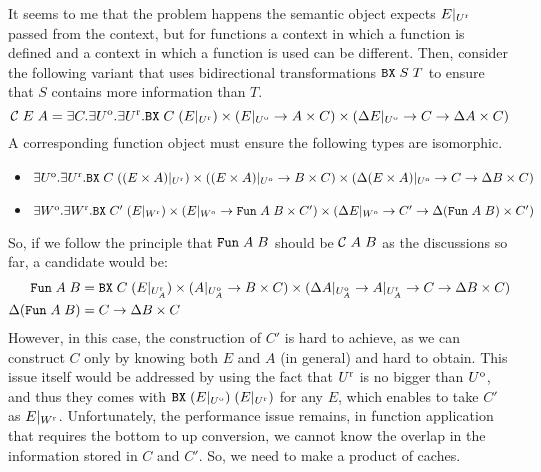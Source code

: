 \documentclass{article}
\theoremstyle{definition}
\begin{document}
It seems to me that the problem happens the semantic object expects $E|_{U^\mathrm{r}}$ passed from the context, but for functions a context in which a function is defined
and a context in which a function is used can be different. 
Then, consider the following variant that uses bidirectional transformations $\texttt{BX} \; S \; T$ to ensure that $S$ contains more information than $T$. 
\[
\mathcal{C} \; E \; A = \exists C. \exists U^\mathrm{o}. \exists U^\mathrm{r}. 
  \texttt{BX} \; C \; (E|_{U^\mathrm{r}}) \times 
  (E|_{U^\mathrm{o}} \to {A} \times C) \times 
  (\Delta E|_{U^\mathrm{o}} \to C \to \Delta A \times C)
\]
A corresponding function object must ensure the following types are isomorphic. 
\begin{itemize}
 \item \(
   \exists U^\mathrm{o}. \exists U^\mathrm{r}. 
   \texttt{BX} \; C \; ((E \times A)|_{U^\mathrm{r}}) \times 
   ((E \times A)|_{U^\mathrm{o}} \to {B} \times C) \times 
   (\Delta (E \times A)|_{U^\mathrm{o}} \to C \to \Delta B \times C)
   \) 
 \item \(
   \exists W^\mathrm{o}. \exists W^\mathrm{r}. 
   \texttt{BX} \; C' \; (E|_{W^\mathrm{r}}) \times 
   (E|_{W^\mathrm{o}} \to \texttt{Fun} \; A \; B \times C') \times 
   (\Delta E|_{W^\mathrm{o}}  \to C' \to \Delta (\texttt{Fun} \; A \; B) \times C')
   \)
\end{itemize} 
So, if we follow the principle that $\texttt{Fun} \; A \; B$ should be $\mathcal{C} \; A \; B$ as the discussions so far, a candidate would be: 
\begin{align*}
\texttt{Fun} \; A \; B &= \texttt{BX} \; C \; (E|_{U_A^\mathrm{r}}) \times (A|_{U_A^\mathrm{o}} \to B \times C) \times (\Delta A|_{U_A^\mathrm{o}} \to A|_{U_A^\mathrm{r}} \to C \to \Delta B \times C)\\
\Delta (\texttt{Fun} \; A \; B) &= C \to \Delta B \times C
\end{align*}
However, in this case, the construction of $C'$ is hard to achieve, as we can construct $C$ only by knowing both $E$ and $A$ (in general) and hard to obtain. 
This issue itself would be addressed by using the fact that $U^\mathrm{r}$ is no bigger than $U^\mathrm{o}$, and thus they comes with $\texttt{BX} \; (E|_{U^\mathrm{o}}) \; (E|_{U^\mathrm{r}})$ for any $E$, which enables to take $C'$ as $E|_{W^\mathrm{r}}$. 
Unfortunately, the performance issue remains, in function application that requires the bottom to up conversion, we cannot know the overlap in the information stored in $C$ and $C'$. 
So, we need to make a product of caches. 
\end{document}
